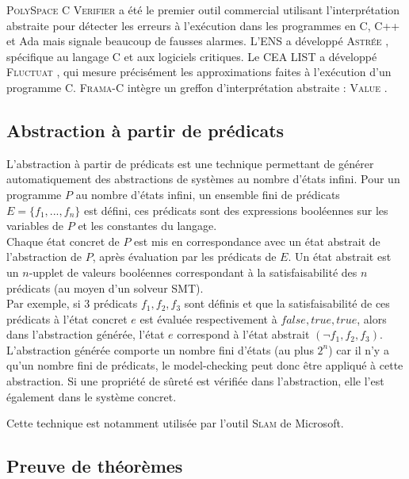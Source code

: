 \textsc{PolySpace C Verifier} \cite{PolySpace} a été le premier outil commercial
utilisant l'interprétation abstraite pour détecter les erreurs à l'exécution
dans les programmes en C, C++ et Ada mais signale beaucoup de fausses alarmes.
L'ENS a développé \textsc{Astrée} \cite{ASTREE}, spécifique au langage C et aux
logiciels critiques. Le CEA LIST a développé \textsc{Fluctuat} \cite{Fluctuat},
qui mesure précisément les approximations faites à l'exécution d'un programme C.
\textsc{Frama-C} intègre un greffon d'interprétation abstraite : \textsc{Value}
\cite{Value}.



\subsection{Abstraction à partir de prédicats}
\label{sec:abstraction-predicats}

L'abstraction à partir de prédicats \cite{predicate-abstraction} est une
technique permettant de générer automatiquement des abstractions de systèmes au
nombre d'états infini. Pour un programme $P$ au nombre d'états infini, un
ensemble fini de prédicats $E = \{f_1, ..., f_n\}$ est défini, ces prédicats
sont des expressions booléennes sur les variables de $P$ et les constantes du
langage.\\

Chaque état concret de $P$ est mis en correspondance avec un état abstrait de
l'abstraction de $P$, après évaluation par les prédicats de $E$. Un état
abstrait est un $n$-upplet de valeurs booléennes correspondant à la
satisfaisabilité des $n$ prédicats (au moyen d'un solveur SMT).\\

Par exemple, si 3 prédicats $f_1, f_2, f_3$ sont définis et que la
satisfaisabilité de ces prédicats à l'état concret $e$ est évaluée
respectivement à $false, true, true$, alors dans l'abstraction générée, l'état
$e$ correspond à l'état abstrait $(\lnot f_1, f_2, f_3)$.\\

L'abstraction générée comporte un nombre fini d'états (au plus $2^n$) car il n'y
a qu'un nombre fini de prédicats, le model-checking peut donc être appliqué à
cette abstraction. Si une propriété de sûreté est vérifiée dans l'abstraction,
elle l'est également dans le système concret.

Cette technique est notamment utilisée par l'outil \textsc{Slam} \cite{SLAM} de
Microsoft.


\subsection{Preuve de théorèmes}
\label{sec:preuve}

